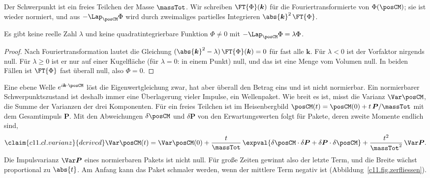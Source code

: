 \begin{vertiefung}[id=c11.v1,
    titel={Warum der Schwerpunkt zerfließt},
    wozu={Der Kern behauptet, dass der Schwerpunkt eines Atoms kein Energieeigenzustand
      sein kann, sondern immer ein Wellenpaket ist, und dass dieses Paket zerfließt. Hier
      steht die Rechnung dazu.},
    voraussetzung={Kern~\ref{c11.s2} und \ref{c11.s3}; die Fouriertransformation aus
      Kapitel~\ref{c05}. Nicht nötig für die Abschnitte~\ref{c11.s4} bis \ref{c11.s7}.},
    zurueck={Die innere Dichte $\abs{\psi}^2$ eines Energieeigenzustands steht still;
      die Dichte des Schwerpunkts und mit ihr die Dichten von Elektron und Proton im
      Labor laufen auseinander.}]
  Der Schwerpunkt ist ein freies Teilchen der Masse $\massTot$. Wir schreiben
  $\FT{\Phi}(\boldsymbol{k})$ für die Fouriertransformierte von $\Phi(\posCM)$; sie ist
  wieder normiert, und aus $-\Lap_{\posCM}\Phi$ wird durch zweimaliges partielles
  Integrieren $\abs{\boldsymbol{k}}^2\,\FT{\Phi}$.

  \begin{proposition}\label{c11.prop.kein-eigenzustand}
    Es gibt keine reelle Zahl $\lambda$ und keine quadratintegrierbare Funktion
    $\Phi \neq 0$ mit $-\Lap_{\posCM}\Phi = \lambda\Phi$.
  \end{proposition}
  \begin{proof}
    Nach Fouriertransformation lautet die Gleichung
    $(\abs{\boldsymbol{k}}^2 - \lambda)\,\FT{\Phi}(\boldsymbol{k}) = 0$ für fast alle
    $\boldsymbol{k}$. Für $\lambda < 0$ ist der Vorfaktor nirgends null. Für
    $\lambda \geq 0$ ist er nur auf einer Kugelfläche (für $\lambda = 0$: in einem Punkt)
    null, und das ist eine Menge vom Volumen null. In beiden Fällen ist $\FT{\Phi}$ fast
    überall null, also $\Phi = 0$.
  \end{proof}

  Eine ebene Welle $e^{i\boldsymbol{k}\cdot\posCM}$ löst die Eigenwertgleichung zwar,
  hat aber überall den Betrag eins und ist nicht normierbar. Ein normierbarer
  Schwerpunktszustand ist deshalb immer eine Überlagerung vieler Impulse, ein
  Wellenpaket. Wie breit es ist, misst die Varianz $\Var\posCM$, die Summe der Varianzen
  der drei Komponenten. Für ein freies Teilchen ist im Heisenbergbild
  $\posCM(t) = \posCM(0) + t\,\boldsymbol{P}/\massTot$ mit dem Gesamtimpuls
  $\boldsymbol{P}$. Mit den Abweichungen $\delta\posCM$ und $\delta\boldsymbol{P}$ von
  den Erwartungswerten folgt für Pakete, deren zweite Momente endlich sind,
  \begin{equation}\label{c11.eq.varianz}\claim{c11.cl.varianz}{derived}
    \Var\posCM(t) = \Var\posCM(0)
    + \frac{t}{\massTot}\,\expval{\delta\posCM \cdot \delta\boldsymbol{P}
      + \delta\boldsymbol{P} \cdot \delta\posCM}
    + \frac{t^2}{\massTot^2}\,\Var\boldsymbol{P}.
  \end{equation}
  Die Impulsvarianz $\Var\boldsymbol{P}$ eines normierbaren Pakets ist nicht null. Für
  große Zeiten gewinnt also der letzte Term, und die Breite wächst proportional zu
  $\abs{t}$. Am Anfang kann das Paket schmaler werden, wenn der mittlere Term negativ
  ist (Abbildung~\ref{c11.fig.zerfliessen}).


\end{vertiefung}
